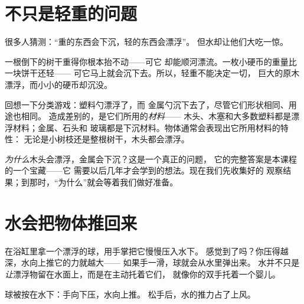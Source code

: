 \section{不只是轻重的问题}

很多人猜测：“重的东西会下沉，轻的东西会漂浮”。
但水却让他们大吃一惊。

\begin{example}[原木与硬币]\label{ex:g1:floating-and-sinking:log}
一根倒下的树干重得你根本抬不动——可它
却能顺河漂流。一枚小硬币的重量比一块饼干还轻——
可它马上就会沉下去。所以，轻重不能决定一切，
巨大的原木漂浮，而小小的硬币却沉没。
\end{example}

\begin{example}[起作用的是材料]\label{ex:g1:floating-and-sinking:stuff}
回想一下分类游戏：塑料勺漂浮了，而
金属勺沉下去了，尽管它们形状相同、用途也相同。
造成差别的，是它们所用的\emph{材料}——
木头、木塞和大多数塑料都是漂浮材料；金属、石头和
玻璃都是下沉材料。物体通常会表现出它所用材料的特性：
无论是小树枝还是整根树干，木头都会漂浮。
\end{example}

\begin{remark}[一点小小的疑问]\label{rem:g1:floating-and-sinking:why}
\emph{为什么}木头会漂浮，金属会下沉？这是一个真正的问题，
它的完整答案是本课程的一个宝藏——它
需要以后几年才会学到的想法。现在我们先收集好的
观察结果；到那时，“为什么”就会等着我们做好准备。
\end{remark}

\section{水会把物体推回来}

\begin{example}\label{ex:g1:floating-and-sinking:push}
在浴缸里拿一个漂浮的球，用手掌把它慢慢压入水下。
感觉到了吗？你压得越深，水向上推它的力就越大——
如果手一滑，球就会从水里弹出来。
水并不只是\emph{让}漂浮物留在水面上，而是在主动托着它们，
就像你的双手托着一个婴儿。
\end{example}

\begin{omfigure}

{\small 球被按在水下：手向下压，水向上推。
松手后，水的推力占了上风。}
\end{omfigure}

